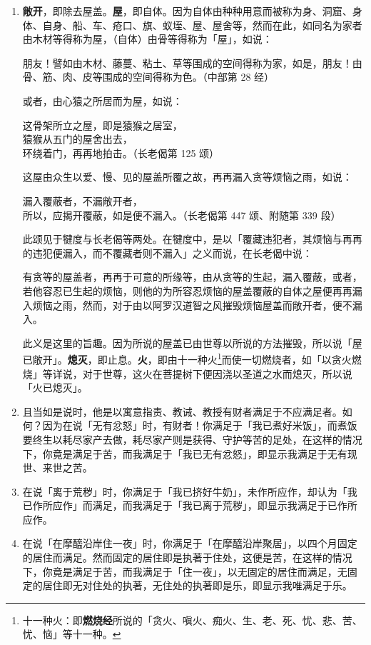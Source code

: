 \begin{enumerate}
\item \textbf{敞开}，即除去屋盖。\textbf{屋}，即自体。因为自体由种种用意而被称为身、洞窟、身体、自身、船、车、疮口、旗、蚁垤、屋、屋舍等，然而在此，如同名为家者由木材等得称为屋，（自体）由骨等得称为「屋」，如说：\begin{quoting}朋友！譬如由木材、藤蔓、粘土、草等围成的空间得称为家，如是，朋友！由骨、筋、肉、皮等围成的空间得称为色。（中部第 28 经）\end{quoting}或者，由心猿之所居而为屋，如说：\begin{quoting}这骨架所立之屋，即是猿猴之居室，\\猿猴从五门的屋舍出去，\\环绕着门，再再地拍击。（长老偈第 125 颂）\end{quoting}这屋由众生以爱、慢、见的屋盖所覆之故，再再漏入贪等烦恼之雨，如说：\begin{quoting}漏入覆蔽者，不漏敞开者，\\所以，应揭开覆蔽，如是便不漏入。（长老偈第 447 颂、附随第 339 段）\end{quoting}此颂见于犍度与长老偈等两处。在犍度中，是以「覆藏违犯者，其烦恼与再再的违犯便漏入，而不覆藏者则不漏入」之义而说，在长老偈中说：\begin{quoting}有贪等的屋盖者，再再于可意的所缘等，由从贪等的生起，漏入覆蔽，或者，若他容忍已生起的烦恼，则他的为所容忍烦恼的屋盖覆蔽的自体之屋便再再漏入烦恼之雨，然而，对于由以阿罗汉道智之风摧毁烦恼屋盖而敞开者，便不漏入。\end{quoting}此义是这里的旨趣。因为所说的屋盖已由世尊以所说的方法摧毁，所以说「屋已敞开」。\textbf{熄灭}，即止息。\textbf{火}，即由十一种火\footnote{十一种火：即\textbf{燃烧经}所说的「贪火、嗔火、痴火、生、老、死、忧、悲、苦、忧、恼」等十一种。}而使一切燃烧者，如「以贪火燃烧」等详说，对于世尊，这火在菩提树下便因浇以圣道之水而熄灭，所以说「火已熄灭」。
\item 且当如是说时，他是以寓意指责、教诫、教授有财者满足于不应满足者。如何？因为在说「无有忿怒」时，有财者！你满足于「我已煮好米饭」，而煮饭要终生以耗尽家产去做，耗尽家产则是获得、守护等苦的足处，在这样的情况下，你竟是满足于苦，而我满足于「我已无有忿怒」，即显示我满足于无有现世、来世之苦。
\item 在说「离于荒秽」时，你满足于「我已挤好牛奶」，未作所应作，却认为「我已作所应作」而满足，而我满足于「我已离于荒秽」，即显示我满足于已作所应作。
\item 在说「在摩醯沿岸住一夜」时，你满足于「在摩醯沿岸聚居」，以四个月固定的居住而满足。然而固定的居住即是执著于住处，这便是苦，在这样的情况下，你竟是满足于苦，而我满足于「住一夜」，以无固定的居住而满足，无固定的居住即无对住处的执著，无住处的执著即是乐，即显示我唯满足于乐。

\end{enumerate}
